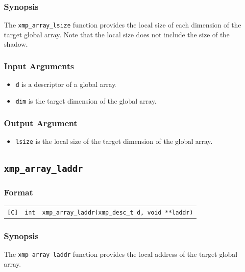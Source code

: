 \subsubsection*{Synopsis}

The {\tt xmp\_array\_lsize} function provides the local size of each
dimension of the target global array. 
Note that the local size does not include the size of the shadow.

\subsubsection*{Input Arguments}
\begin{itemize}
 \item {\tt d} is a descriptor of a global array.
 \item {\tt dim} is the target dimension of the global array.
\end{itemize}

\subsubsection*{Output Argument}
\begin{itemize}
 \item {\tt lsize} is the local size of the target dimension of the global array.
\end{itemize}


\subsection{\tt xmp\_array\_laddr}

\subsubsection*{Format}

\begin{tabular}{lll}

\verb![C]!&  {\tt int}& {\tt xmp\_array\_laddr(xmp\_desc\_t d, void **laddr)}\\

\end{tabular}

\subsubsection*{Synopsis}

The {\tt xmp\_array\_laddr} function provides the local address of the
target global array. 

